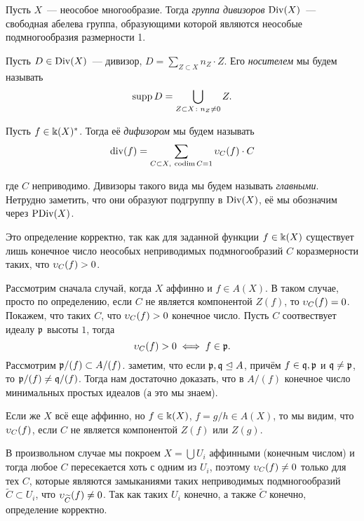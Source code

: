 	\begin{definition} 
		Пусть $X$~--- неособое многообразие. Тогда \emph{группа дивизоров} $\operatorname{Div}(X)$~--- свободная абелева группа, образующими которой являются неособые подмногообразия размерности 1.   

		Пусть $D \in \operatorname{Div}(X)$~--- дивизор, $D = \sum_{Z \subset X} n_{Z} \cdot Z$. Его \emph{носителем} мы будем называть 
		\[
			\operatorname{supp}{D} = \bigcup_{Z \subset X \colon n_{Z} \neq 0} Z. 
		\]
	\end{definition}

	\begin{definition} 
		Пусть $f \in \Bbbk(X)^*$. Тогда её \emph{дифизором} мы будем называть 
		\[
			\operatorname{div}(f) = \sum_{C \subset X, \ \operatorname{codim}{C} = 1} \upsilon_{C}(f) \cdot C
		\]

		где $C$ неприводимо. Дивизоры такого вида мы будем называть \emph{главными}. Нетрудно заметить, что они образуют подгруппу в $\operatorname{Div}(X)$, её мы обозначим через $\operatorname{PDiv}(X)$. 
	\end{definition}

	\begin{remark}
		Это определение корректно, так как для заданной функции $f \in \Bbbk(X)$ существует лишь конечное число неособых неприводимых подмногообразий $C$ коразмерности таких, что $\upsilon_{C}(f) > 0$. 

		Рассмотрим сначала случай, когда $X$ аффинно и $f \in A(X)$. В таком случае, просто по определению, если $C$ не является компонентой $Z(f)$, то $\upsilon_{C}(f) = 0$. Покажем, что таких $C$, что $\upsilon_{C}(f) > 0$ конечное число. Пусть $C$ соотвествует идеалу $\mathfrak{p}$ высоты $1$, тогда 
		\[
			\upsilon_{C}(f) > 0 \iff f \in \mathfrak{p}.
		\]
		Рассмотрим $\mathfrak{p}/(f) \subset A/(f)$. заметим, что если $\mathfrak{p}, \mathfrak{q} \trianglelefteq A$, причём $f \in \mathfrak{q}, \mathfrak{p}$ и $\mathfrak{q} \neq \mathfrak{p}$, то $\mathfrak{p}/(f) \neq \mathfrak{q}/(f)$. Тогда нам достаточно доказать, что в $A/(f)$ конечное число минимальных простых идеалов (а это мы знаем). 


		Если же $X$ всё еще аффинно, но $f \in \Bbbk(X)$, $f = g/h \in A(X)$, то мы видим, что $\upsilon_{C}(f)$, если $C$ не является компонентой $Z(f)$ или $Z(g)$. 

		В произвольном случае мы покроем $X = \bigcup U_i$ аффинными (конечным числом) и тогда  любое $C$ пересекается хоть с одним из $U_i$, поэтому $\upsilon_{C}(f) \neq 0 $ только для тех $C$, которые являются замыканиями таких неприводимых подмногообразий $\widetilde{C} \subset U_i$, что $\upsilon_{\widetilde{C}}(f) \neq 0$. Так как таких $U_i$ конечно, а также $\widetilde{C}$ конечно, определение корректно.
	\end{remark}

